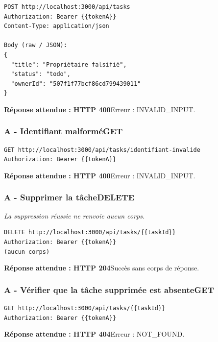 \documentclass[10pt,a4paper]{article}
\newcommand{\expected}[2]{\par\smallskip\noindent\colorbox{forest!9}{\parbox{\dimexpr\linewidth-2\fboxsep}{\textcolor{forest}{\textbf{Réponse attendue : HTTP #1}}\hspace{0.4em}#2}}\par\medskip}
\newcommand{\reqheading}[3]{\subsubsection*{\textcolor{forest}{#1}\hfill\textcolor{ink}{\small #2}}\textit{#3}\par}
\begin{document}
\begin{lstlisting}[style=requestcode]
POST http://localhost:3000/api/tasks
Authorization: Bearer {{tokenA}}
Content-Type: application/json

Body (raw / JSON):
{
  "title": "Propriétaire falsifié",
  "status": "todo",
  "ownerId": "507f1f77bcf86cd799439011"
}
\end{lstlisting}
\expected{400}{Erreur : INVALID\_INPUT.}
\vspace{0.25em}
\reqheading{A - Identifiant malformé}{GET}{}
\begin{lstlisting}[style=requestcode]
GET http://localhost:3000/api/tasks/identifiant-invalide
Authorization: Bearer {{tokenA}}
\end{lstlisting}
\expected{400}{Erreur : INVALID\_INPUT.}
\vspace{0.25em}
\reqheading{A - Supprimer la tâche}{DELETE}{La suppression réussie ne renvoie aucun corps.}
\begin{lstlisting}[style=requestcode]
DELETE http://localhost:3000/api/tasks/{{taskId}}
Authorization: Bearer {{tokenA}}
(aucun corps)
\end{lstlisting}
\expected{204}{Succès sans corps de réponse.}
\vspace{0.25em}
\reqheading{A - Vérifier que la tâche supprimée est absente}{GET}{}
\begin{lstlisting}[style=requestcode]
GET http://localhost:3000/api/tasks/{{taskId}}
Authorization: Bearer {{tokenA}}
\end{lstlisting}
\expected{404}{Erreur : NOT\_FOUND.}
\vspace{0.25em}
\newpage
\end{document}
